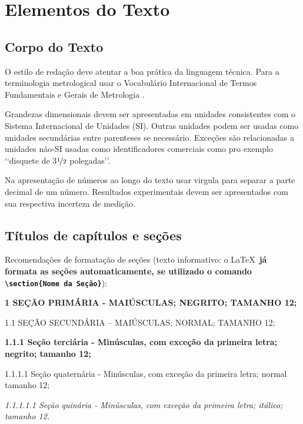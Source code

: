 \chapter[Elementos do Texto]{Elementos do Texto}

\section{Corpo do Texto}

O estilo de redação deve atentar a boa prática da linguagem técnica. Para a 
terminologia metrological usar o Vocabulário Internacional de Termos 
Fundamentais e Gerais de Metrologia .

Grandezas dimensionais devem ser apresentadas em unidades consistentes com 
o Sistema Internacional de Unidades  (SI). Outras unidades podem ser usadas 
como unidades secundárias entre parenteses se necessário. Exceções são 
relacionadas a unidades não-SI usadas como identificadores comerciais como 
pro exemplo \lq\lq disquete de  3$\nicefrac{1}{2}$ polegadas\rq\rq. 

Na apresentação de números ao longo do texto usar virgula para separar a 
parte decimal de um número. Resultados experimentais devem ser apresentados 
com sua respectiva incerteza de medição.

\section{Títulos de capítulos e seções}

Recomendações de formatação de seções (texto informativo: o \LaTeX\
\textbf{já formata as seções automaticamente, se utilizado o comando
\texttt{\textbackslash section\{Nome da Seção\}}}):

\begin{description}

	\item \textbf{1 SEÇÃO PRIMÁRIA - MAIÚSCULAS; NEGRITO; TAMANHO 12;}

	\item 1.1 SEÇÃO SECUNDÁRIA – MAIÚSCULAS; NORMAL; TAMANHO 12; 

	\item \textbf{1.1.1 Seção terciária - Minúsculas, com exceção da 
	primeira letra; negrito; tamanho 12;}

	\item 1.1.1.1 Seção quaternária - Minúsculas, com exceção da primeira 
	letra; normal tamanho 12; 

 	\item \textit{1.1.1.1.1 Seção quinária - Minúsculas, com exceção da 
	primeira letra; itálico; tamanho 12.}

\end{description}

